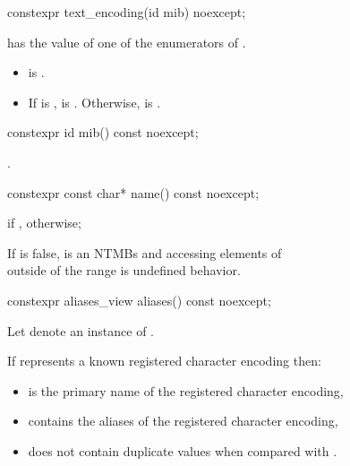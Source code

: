 \documentclass{wg21}
\begin{document}
\begin{addedblock}
\begin{itemdecl}
constexpr text_encoding(id mib) noexcept;
\end{itemdecl}

\begin{itemdescr}
    \preconditions
     has the value of one of the enumerators of .

    \postcondition
    \begin{itemize}
       \item  {} is .
       \item  If  is ,  is . Otherwise,
        is .
    \end{itemize}
\end{itemdescr}


\begin{itemdecl}
constexpr id mib() const noexcept;
\end{itemdecl}

\begin{itemdescr}
\returns {}.

\end{itemdescr}

\begin{itemdecl}
constexpr const char* name() const noexcept;
\end{itemdecl}
\begin{itemdescr}
\returns {} if ,  otherwise;

\remarks
If  is false,  is an NTMBs and accessing elements of\\
 outside of the range  is undefined behavior.
\end{itemdescr}

\begin{itemdecl}
constexpr aliases_view aliases() const noexcept;
\end{itemdecl}


\begin{itemdescr}

Let  denote an instance of .

\pnum If  represents a known registered character encoding then:
\begin{itemize}
    \item {} is the  primary name of the registered character encoding,
    \item {} contains the aliases of the registered character encoding,
    \item {} does not contain duplicate values when compared with .
\end{itemize}


\end{itemdescr}
\end{addedblock}
\end{document}
